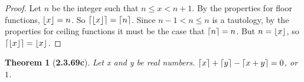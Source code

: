 \documentclass[a4paper, 12pt]{article}
\theoremstyle{plain}
\newtheorem*{theorem*}{Theorem}
\DeclarePairedDelimiter{\floor}{\lfloor}{\rfloor}
\DeclarePairedDelimiter{\ceil}{\lceil}{\rceil}
\begin{document}
\begin{proof}
    Let $n$ be the integer such that $n \le x < n+1$. By the properties for floor functions, 
    $\floor{x} = n$. So $\ceil{\floor{x}} = \ceil{n}$. Since $n-1 < n \le n$ is a tautology, 
    by the properties for ceiling functions it must be the case that $\ceil{n} = n$. 
    But $n = \floor{x}$, so $\ceil{\floor{x}} = \floor{x}$.
\end{proof}

\pagebreak


\begin{theorem*}[\textbf{2.3.69c}]
    Let x and y be real numbers. \newline $\ceil{x} + \ceil{y} - \ceil{x + y} = 0$, or $1$.		
\end{theorem*}
\end{document}
